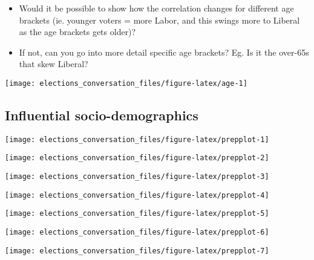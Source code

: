 \documentclass[11pt,a4paper,]{article}
\providecommand{\tightlist}{%
  \setlength{\itemsep}{0pt}\setlength{\parskip}{0pt}}
\begin{document}
\begin{itemize}
\tightlist
\item
  Would it be possible to show how the correlation changes for different age brackets (ie. younger voters = more Labor, and this swings more to Liberal as the age brackets gets older)?
\item
  If not, can you go into more detail specific age brackets? Eg. Is it the over-65s that skew Liberal?
\end{itemize}

\begin{center}\texttt{[image: elections\_conversation\_files/figure-latex/age-1]} \end{center}

\hypertarget{influential-socio-demographics}{%
\subsection{Influential socio-demographics}\label{influential-socio-demographics}}

\begin{center}\texttt{[image: elections\_conversation\_files/figure-latex/prepplot-1]} \end{center}

\begin{center}\texttt{[image: elections\_conversation\_files/figure-latex/prepplot-2]} \end{center}

\begin{center}\texttt{[image: elections\_conversation\_files/figure-latex/prepplot-3]} \end{center}

\begin{center}\texttt{[image: elections\_conversation\_files/figure-latex/prepplot-4]} \end{center}

\begin{center}\texttt{[image: elections\_conversation\_files/figure-latex/prepplot-5]} \end{center}

\begin{center}\texttt{[image: elections\_conversation\_files/figure-latex/prepplot-6]} \end{center}

\begin{center}\texttt{[image: elections\_conversation\_files/figure-latex/prepplot-7]} \end{center}
\end{document}
